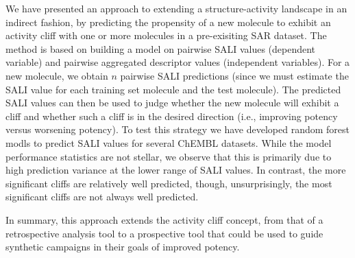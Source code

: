 \documentclass[letterpaper, 12pt]{article}
\begin{document}
We have presented an approach to extending a structure-activity
landscape in an indirect fashion, by predicting the propensity of a
new molecule to exhibit an activity cliff with one or more molecules
in a pre-exisiting SAR dataset. The method is based on building
a model on pairwise SALI values (dependent variable) and pairwise
aggregated descriptor values (independent variables). For a new
molecule, we obtain $n$ pairwise SALI predictions (since we must
estimate the SALI value for each training set molecule and the test
molecule). The predicted SALI values can then be used to judge whether
the new molecule will exhibit a cliff and whether such a cliff is in
the desired direction (i.e., improving potency versus worsening
potency). To test this strategy we have developed random forest modls
to predict SALI values for several ChEMBL datasets. While the model
performance statistics are not stellar, we observe that this is
primarily due to high prediction variance at the lower range of SALI
values. In contrast, the more significant cliffs are relatively well
predicted, though, unsurprisingly, the most significant cliffs are not
always well predicted. 

In summary, this approach extends the activity cliff concept, from
that of a retrospective analysis tool to a prospective tool that could
be used to guide synthetic campaigns in their goals of improved
potency.

\clearpage
\newpage
\end{document}
